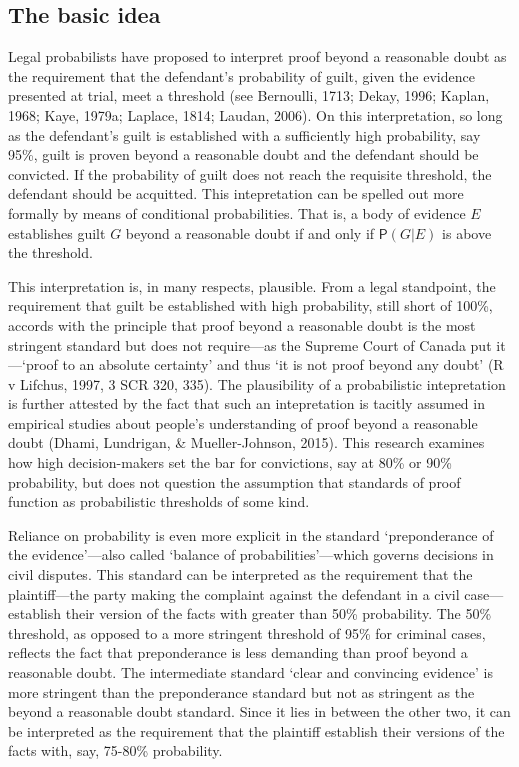 \documentclass[10pt,dvipsnames,enabledeprecatedfontcommands]{scrartcl}
\newcommand{\pr}[1]{\mathsf{P}(#1)}
\begin{document}
\subsection{The basic idea}\label{the-basic-idea}

Legal probabilists have proposed to interpret proof beyond a reasonable
doubt as the requirement that the defendant's probability of guilt,
given the evidence presented at trial, meet a threshold (see Bernoulli,
1713; Dekay, 1996; Kaplan, 1968; Kaye, 1979a; Laplace, 1814; Laudan,
2006). On this interpretation, so long as the defendant's guilt is
established with a sufficiently high probability, say 95\%, guilt is
proven beyond a reasonable doubt and the defendant should be convicted.
If the probability of guilt does not reach the requisite threshold, the
defendant should be acquitted. This intepretation can be spelled out
more formally by means of conditional probabilities. That is, a body of
evidence \(E\) establishes guilt \(G\) beyond a reasonable doubt if and
only if \(\pr{G\vert E}\) is above the threshold.

This interpretation is, in many respects, plausible. From a legal
standpoint, the requirement that guilt be established with high
probability, still short of 100\%, accords with the principle that proof
beyond a reasonable doubt is the most stringent standard but does not
require---as the Supreme Court of Canada put it---`proof to an absolute
certainty' and thus `it is not proof beyond any doubt' (R v Lifchus,
1997, 3 SCR 320, 335). The plausibility of a probabilistic intepretation
is further attested by the fact that such an intepretation is tacitly
assumed in empirical studies about people's understanding of proof
beyond a reasonable doubt (Dhami, Lundrigan, \& Mueller-Johnson, 2015).
This research examines how high decision-makers set the bar for
convictions, say at 80\% or 90\% probability, but does not question the
assumption that standards of proof function as probabilistic thresholds
of some kind.

Reliance on probability is even more explicit in the standard
`preponderance of the evidence'---also called `balance of
probabilities'---which governs decisions in civil disputes. This
standard can be interpreted as the requirement that the plaintiff---the
party making the complaint against the defendant in a civil
case---establish their version of the facts with greater than 50\%
probability. The 50\% threshold, as opposed to a more stringent
threshold of 95\% for criminal cases, reflects the fact that
preponderance is less demanding than proof beyond a reasonable doubt.
The intermediate standard `clear and convincing evidence' is more
stringent than the preponderance standard but not as stringent as the
beyond a reasonable doubt standard. Since it lies in between the other
two, it can be interpreted as the requirement that the plaintiff
establish their versions of the facts with, say, 75-80\% probability.
\end{document}

